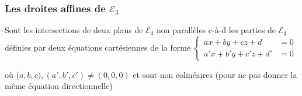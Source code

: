 \documentclass[12pt,a4paper,french]{book}
\begin{document}
			\subsubsection{Les droites affines de $\mathcal{E}_3$}
				Sont les intersections de deux plans de $\mathcal{E}_3$ non parallèles c-à-d les parties de $\mathcal{E}_3$ définies par deux équations cartésiennes de la forme $\left\lbrace \begin{array}{ll}
					 ax+by+cz+d&=0 \\a'x+b'y+c'z+d' &= 0
				\end{array}\right.$
				
				où ($a,b,c),(a',b',c') \neq (0,0,0)$ et sont non colinéaires (pour ne pas donner la même équation directionnelle)
				
				
				
\end{document}
